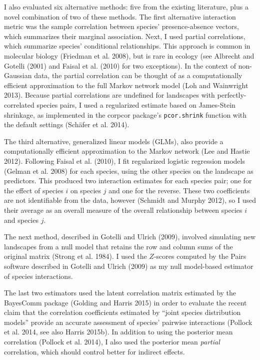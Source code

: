 \documentclass[12pt,]{article}
\begin{document}
\begin{spacing}{1.9}
\begin{flushleft}
I also evaluated six alternative methods: five from the existing
literature, plus a novel combination of two of these methods. The first
alternative interaction metric was the sample correlation between
species' presence-absence vectors, which summarizes their marginal
association. Next, I used partial correlations, which summarize species'
conditional relationships. This approach is common in molecular biology
(Friedman et al. 2008), but is rare in ecology (see Albrecht and Gotelli
(2001) and Faisal et al. (2010) for two exceptions). In the context of
non-Gaussian data, the partial correlation can be thought of as a
computationally efficient approximation to the full Markov network model
(Loh and Wainwright 2013). Because partial correlations are undefined
for landscapes with perfectly-correlated species pairs, I used a
regularized estimate based on James-Stein shrinkage, as implemented in
the corpcor package's \texttt{pcor.shrink} function with the default
settings (Schäfer et al. 2014).

The third alternative, generalized linear models (GLMs), also provide a
computationally efficient approximation to the Markov network (Lee and
Hastie 2012). Following Faisal et al. (2010), I fit regularized logistic
regression models (Gelman et al. 2008) for each species, using the other
species on the landscape as predictors. This produced two interaction
estimates for each species pair; one for the effect of species \(i\) on
species \(j\) and one for the reverse. These two coefficients are not
identifiable from the data, however (Schmidt and Murphy 2012), so I used
their average as an overall measure of the overall relationship between
species \(i\) and species \(j\).

The next method, described in Gotelli and Ulrich (2009), involved
simulating new landscapes from a null model that retains the row and
column sums of the original matrix (Strong et al. 1984). I used the
\(Z\)-scores computed by the Pairs software described in Gotelli and
Ulrich (2009) as my null model-based estimator of species interactions.

The last two estimators used the latent correlation matrix estimated by
the BayesComm package (Golding and Harris 2015) in order to evaluate the
recent claim that the correlation coefficients estimated by ``joint
species distribution models'' provide an accurate assessment of species'
pairwise interactions (Pollock et al. 2014, see also Harris 2015b). In
addition to using the posterior mean correlation (Pollock et al. 2014),
I also used the posterior mean \emph{partial} correlation, which should
control better for indirect effects.


\end{flushleft}
\end{spacing}
\end{document}
